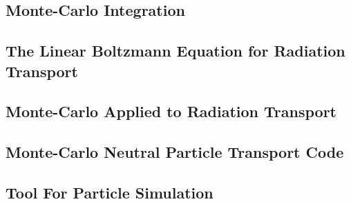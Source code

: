 \subsection{Monte-Carlo Integration}

\subsection{The Linear Boltzmann Equation for Radiation Transport}

\subsection{Monte-Carlo Applied to Radiation Transport}

\subsection{Monte-Carlo Neutral Particle Transport Code}

\subsection{Tool For Particle Simulation}